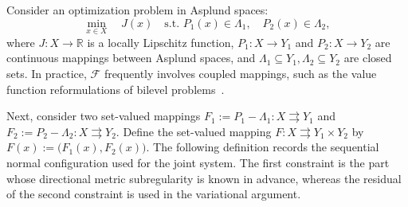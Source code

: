 \documentclass[12pt,twoside,reqno]{amsart}
\theoremstyle{definition}
\numberwithin{equation}{section}
\begin{document}
Consider an optimization problem in Asplund spaces:
\begin{equation} \label{eq:ocpec}
    \min_{x \in X} \quad J(x) \quad \text{s.t. } P_1(x) \in \Lambda_1, \quad P_2(x) \in \Lambda_2,
\end{equation}
where $J: X \to \mathbb{R}$ is a locally Lipschitz function, $P_1: X \to Y_1$ and $P_2: X \to Y_2$ are continuous mappings between Asplund spaces, and $\Lambda_1 \subseteq Y_1, \Lambda_2 \subseteq Y_2$ are closed sets. 
In practice, $\mathcal{F}$ frequently involves coupled mappings, such as the value function reformulations of bilevel problems~\cite{ye1995necessary,Ye2010}.  

Next, consider two set-valued mappings $F_1:=P_1-\Lambda_1: X \rightrightarrows Y_1$ and $F_2:=P_2-\Lambda_2: X \rightrightarrows Y_2$. Define the set-valued mapping $F: X \rightrightarrows Y_1 \times Y_2$ by $F(x) := \big( F_1(x), F_2(x) \big)$. 
The following definition records the sequential normal configuration used for the joint system. The first constraint is the part whose directional metric subregularity is known in advance, whereas the residual of the second constraint is used in the variational argument. 
\end{document}

